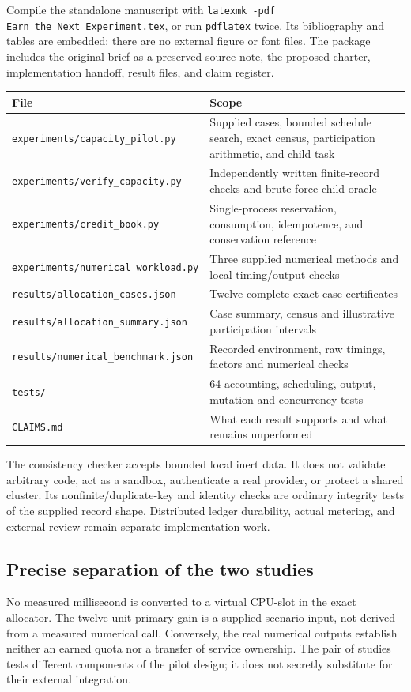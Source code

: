 \documentclass[11pt,letterpaper]{article}
\theoremstyle{remark}\newtheorem{remark}{Remark}[section]
\begin{document}
Compile the standalone manuscript with \texttt{latexmk -pdf Earn\_the\_Next\_Experiment.tex}, or run \texttt{pdflatex} twice. Its bibliography and tables are embedded; there are no external figure or font files. The package includes the original brief as a preserved source note, the proposed charter, implementation handoff, result files, and claim register.

\begin{table}[htbp]\centering\small
\begin{tabularx}{\linewidth}{@{}P{.45\linewidth}Y@{}}\toprule
File & Scope\\\midrule
\texttt{experiments/capacity\_pilot.py} & Supplied cases, bounded schedule search, exact census, participation arithmetic, and child task\\
\texttt{experiments/verify\_capacity.py} & Independently written finite-record checks and brute-force child oracle\\
\texttt{experiments/credit\_book.py} & Single-process reservation, consumption, idempotence, and conservation reference\\
\texttt{experiments/numerical\_workload.py} & Three supplied numerical methods and local timing/output checks\\
\texttt{results/allocation\_cases.json} & Twelve complete exact-case certificates\\
\texttt{results/allocation\_summary.json} & Case summary, census and illustrative participation intervals\\
\texttt{results/numerical\_benchmark.json} & Recorded environment, raw timings, factors and numerical checks\\
\texttt{tests/} & 64 accounting, scheduling, output, mutation and concurrency tests\\
\texttt{CLAIMS.md} & What each result supports and what remains unperformed\\\bottomrule
\end{tabularx}
\end{table}

The consistency checker accepts bounded local inert data. It does not validate arbitrary code, act as a sandbox, authenticate a real provider, or protect a shared cluster. Its nonfinite/duplicate-key and identity checks are ordinary integrity tests of the supplied record shape. Distributed ledger durability, actual metering, and external review remain separate implementation work.

\subsection{Precise separation of the two studies}
No measured millisecond is converted to a virtual CPU-slot in the exact allocator. The twelve-unit primary gain is a supplied scenario input, not derived from a measured numerical call. Conversely, the real numerical outputs establish neither an earned quota nor a transfer of service ownership. The pair of studies tests different components of the pilot design; it does not secretly substitute for their external integration.
\end{document}
